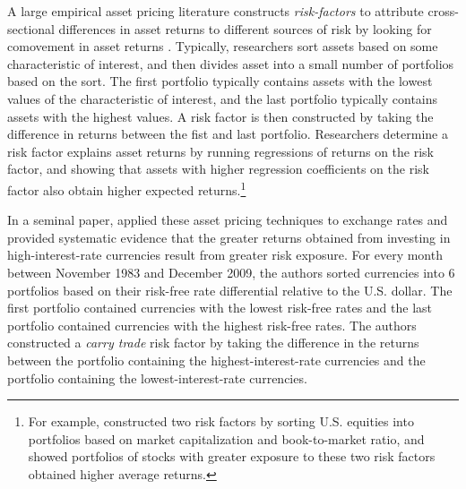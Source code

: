 \documentclass{ar-1col}
\begin{document}
A large empirical asset pricing literature constructs
\emph{risk-factors} to attribute cross-sectional differences in asset
returns to different sources of risk by looking for comovement in
asset returns \citep{Fama1976}. Typically, researchers sort assets
based on some characteristic of interest, and then divides asset into
a small number of portfolios based on the sort. The first portfolio
typically contains assets with the lowest values of the characteristic
of interest, and the last portfolio typically contains assets with the
highest values. A risk factor is then constructed by taking the
difference in returns between the fist and last portfolio. Researchers
determine a risk factor explains asset returns by running regressions
of returns on the risk factor, and showing that assets with higher
regression coefficients on the risk factor also obtain higher expected
returns.\footnote{For example, \citet{FamaFrench1992} constructed two
  risk factors by sorting U.S. equities into portfolios based on
  market capitalization and book-to-market ratio, and showed
  portfolios of stocks with greater exposure to these two risk factors
  obtained higher average returns.}


In a seminal paper, \citet{LustigRoussanovVerdelhan2011} applied these
asset pricing techniques to exchange rates and provided systematic
evidence that the greater returns obtained from investing in
high-interest-rate currencies result from greater risk exposure. For
every month between November 1983 and December 2009, the authors
sorted currencies into 6 portfolios based on their risk-free rate
differential relative to the U.S. dollar. The first portfolio
contained currencies with the lowest risk-free rates and the last
portfolio contained currencies with the highest risk-free rates. The
authors constructed a \emph{carry trade} risk factor by taking the
difference in the returns between the portfolio containing the
highest-interest-rate currencies and the portfolio containing the
lowest-interest-rate currencies.
\end{document}
